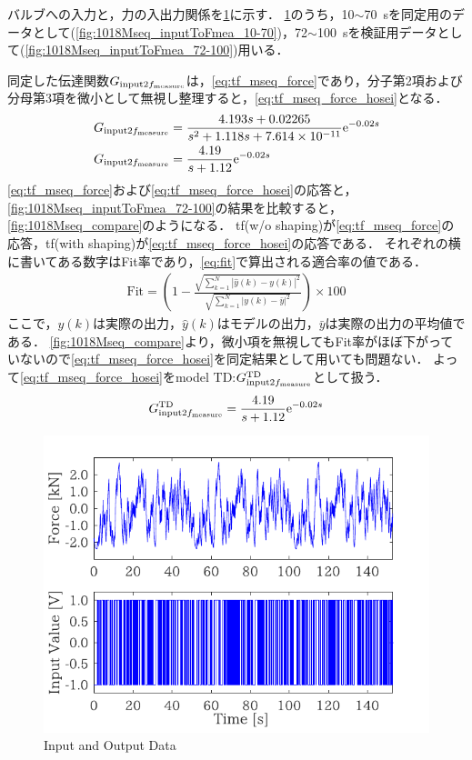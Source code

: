 バルブへの入力と，力の入出力関係を\figname\ref{fig:1018Mseq_inputToFmea}に示す．
\figname\ref{fig:1018Mseq_inputToFmea}のうち，10$\sim$\SI{70}{s}を同定用のデータとして(\figname\ref{fig:1018Mseq_inputToFmea_10-70})，72$\sim$\SI{100}{s}を検証用データとして(\figname\ref{fig:1018Mseq_inputToFmea_72-100})用いる．

同定した伝達関数$G_{\mathrm{input}2f_\mathrm{measure}}$は，\eqnname\eqref{eq:tf_mseq_force}であり，分子第2項および分母第3項を微小として無視し整理すると，\eqnname\eqref{eq:tf_mseq_force_hosei}となる．
\begin{align}
    \label{eq:tf_mseq_force}
    G_{\mathrm{input}2f_\mathrm{measure}}&=\frac{4.193s+0.02265}{s^2 + 1.118s + 7.614\times 10^{-11}}\mathrm{e}^{-0.02s}\\
    \label{eq:tf_mseq_force_hosei} 
    G_{\mathrm{input}2f_\mathrm{measure}}&= \frac{4.19}{s+1.12}\mathrm{e}^{-0.02s}
\end{align}
\eqnname\eqref{eq:tf_mseq_force}および\eqnname\eqref{eq:tf_mseq_force_hosei}の応答と，\figname\ref{fig:1018Mseq_inputToFmea_72-100}の結果を比較すると，\figname\ref{fig:1018Mseq_compare}のようになる．
tf(w/o shaping)が\eqnname\eqref{eq:tf_mseq_force}の応答，tf(with shaping)が\eqnname\eqref{eq:tf_mseq_force_hosei}の応答である．
それぞれの横に書いてある数字はFit率であり，\eqnname\eqref{eq:fit}で算出される適合率の値である．
\begin{align}
    \label{eq:fit}
    \mathrm{Fit} =  \left( 1- \frac{\sqrt{\sum_{k=1}^N |\hat{y}(k)-y(k)|^2 }}{\sqrt{\sum_{k=1}^N |{y}(k)-\bar{y}|^2 }}\right) \times 100
\end{align}
ここで，$y(k)$は実際の出力，$\hat{y}(k)$はモデルの出力，$\bar{y}$は実際の出力の平均値である．
\figname\ref{fig:1018Mseq_compare}より，微小項を無視してもFit率がほぼ下がっていないので\eqnname\eqref{eq:tf_mseq_force_hosei}を同定結果として用いても問題ない．
よって\eqnname\eqref{eq:tf_mseq_force_hosei}をmodel TD:$G_{\mathrm{input}2f_\mathrm{measure}}^{\mathrm{TD}}$として扱う．
\begin{align}
    \label{eq:tf_GTDforce}
    G_{\mathrm{input}2f_\mathrm{measure}}^{\mathrm{TD}} = \frac{4.19}{s+1.12}\mathrm{e}^{-0.02s}
\end{align}
\begin{figure}[t]
    \centering
        \includegraphics[keepaspectratio, scale=1.0]{contents/SystemIdentification/figure/1018Mseq_inputToFmea.pdf}
        \caption{Input and Output Data}
        \label{fig:1018Mseq_inputToFmea}
\end{figure}
